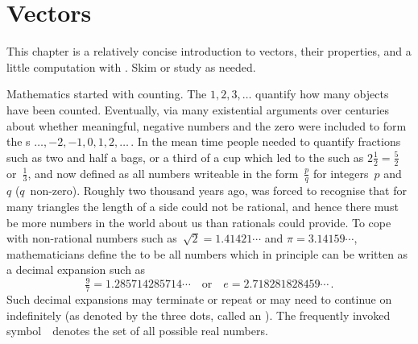 
\chapter{Vectors}
\label{ch:v}
\minitoc

\begin{comment}
Introduce vectors, lines and planes, including adapting material from parts of Chapter~1 \pooliv{pp.1--55}, Chapter~2 (pre-\S2.1) of the book by \cite{Hopcroft2014},  \holti{\S2.1}, \larsvii{\S4.1} (short), et al.
Also Chapter~13 by \cite{HughesHallett2013}.
\end{comment}



\begin{aside}
This chapter is a relatively concise introduction to vectors, their properties, and a little computation with \script.  Skim or study as needed.
\end{aside}

Mathematics started with counting.
The  \(1,2,3,\ldots\) quantify how many objects have been counted.
Eventually, via many existential arguments over centuries about whether meaningful, negative numbers and the zero were included to form the s \(\ldots,-2,-1,0,1,2,\ldots\)\,.
In the mean time people needed to quantify fractions such as two and half a bags, or a third of a cup which led to the  such as \(2\tfrac12=\tfrac52\) or~\(\tfrac13\), and now defined as all numbers writeable in the form~\(\tfrac pq\) for integers~\(p\) and~\(q\) (\(q\)~non-zero).
Roughly two thousand years ago,  was forced to recognise that for many triangles the length of a side could not be rational, and hence there must be more numbers in the world about us than rationals could provide.
To cope with non-rational numbers such as~\(\sqrt2=1.41421\cdots\) and \(\pi=3.14159\cdots\), mathematicians define the  to be all numbers which in principle can be written as a decimal expansion such as
\begin{equation*}
\tfrac97=1.285714285714\cdots
\quad\text{or}\quad
e=2.718281828459\cdots\,.
\end{equation*}
Such decimal expansions may terminate or repeat or may need to continue on indefinitely (as denoted by the three dots, called an ).
The frequently invoked symbol~\RR\ denotes the set of all possible real numbers.


